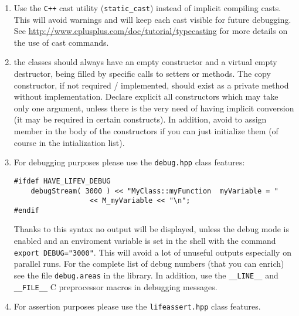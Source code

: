 \documentclass[10p]{article}
\begin{document}
\begin{enumerate}
  \item Use the \texttt{C++} cast utility (\texttt{static\_cast}) instead of implicit compiling casts. This will avoid warnings and will keep each cast visible for future debugging. See
  \url{http://www.cplusplus.com/doc/tutorial/typecasting} for more details on the use of cast commands.
  \item the classes should always have an empty constructor and a virtual empty destructor, being filled by specific calls to setters or methods. The copy constructor, if not required / implemented, should exist as a private method without implementation. Declare explicit all constructors which may take only one argument, unless there is the very need of having implicit conversion (it may be required in certain constructs). In addition, avoid to assign member in the body of the constructors if you can just initialize them (of course in the intialization list).
  \item For debugging purposes please use the \texttt{debug.hpp} class features:
\begin{lstlisting}
#ifdef HAVE_LIFEV_DEBUG
    debugStream( 3000 ) << "MyClass::myFunction  myVariable = "
                  << M_myVariable << "\n";
#endif
\end{lstlisting}
  Thanks to this syntax no output will be displayed, unless the debug mode is enabled and an enviroment variable is set in the shell with the command \texttt{export DEBUG="3000"}. This will avoid a lot of unuseful outputs especially on parallel runs. For the complete list of debug numbers (that you can enrich) see the file \texttt{debug.areas} in the library. In addition, use the \texttt{\_\_LINE\_\_} and \texttt{\_\_FILE\_\_} C preprocessor macros in debugging messages.
  \item For assertion purposes please use the \texttt{lifeassert.hpp} class features.
\end{enumerate}
\end{document}
